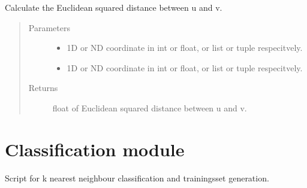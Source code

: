 \documentclass[letterpaper,10pt,english]{sphinxmanual}
\begin{document}

\begin{fulllineitems}
\label{\detokenize{clustering:clustering.squaredEuclideanDist}}
\sphinxAtStartPar
Calculate the Euclidean squared distance between u and v.
\begin{quote}\begin{description}
\item[{Parameters}] \leavevmode\begin{itemize}
\item {} 
\sphinxAtStartPar
{} \textendash{} 1D or ND coordinate in int or float, or list or tuple respecitvely.

\item {} 
\sphinxAtStartPar
{} \textendash{} 1D or ND coordinate in int or float, or list or tuple respecitvely.

\end{itemize}

\item[{Returns}] \leavevmode
\sphinxAtStartPar
float of Euclidean squared distance between u and v.

\end{description}\end{quote}

\end{fulllineitems}



\section{Classification module}
\label{\detokenize{classification:module-classification}}\label{\detokenize{classification:classification-module}}\label{\detokenize{classification::doc}}
\sphinxAtStartPar
Script for k nearest neighbour classification and trainingsset generation.
\end{document}
